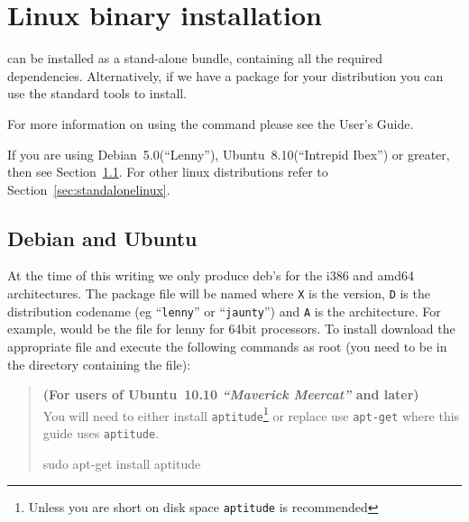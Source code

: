 %
%
%

\section{Linux binary installation}
\label{sec:binlinux}

\esfinley can be installed as a stand-alone bundle, containing all the required dependencies.
Alternatively, if we have a package for your distribution you can use the standard tools to install.


For more information on using the  command please see the User's Guide.

If you are using Debian~5.0(``Lenny''), Ubuntu~8.10(``Intrepid Ibex'') or greater, then see Section~\ref{sec:debian}.
For other linux distributions refer to Section~\ref{sec:standalonelinux}.

\subsection{Debian and Ubuntu}\label{sec:debian}

At the time of this writing we only produce deb's for the i386 and amd64 architectures.
The package file will be named  where \texttt{X} is the version, \texttt{D} is the distribution codename (eg ``\texttt{lenny}'' or ``\texttt{jaunty}'') and \texttt{A} is the architecture.
For example,  would be the file for lenny for 64bit processors.
To install \esfinley download the appropriate  file and execute the following commands as root (you need to be in the directory containing the file):

\begin{verse}
\textbf{(For users of Ubuntu~10.10 \textit{``Maverick Meercat''} and later)}\\
You will need to either install \texttt{aptitude}\footnote{Unless you are short on disk space \texttt{aptitude} is recommended} or replace use \texttt{apt-get} where this guide uses \texttt{aptitude}.
\begin{shellCode}
sudo apt-get install aptitude
\end{shellCode}
\end{verse}

